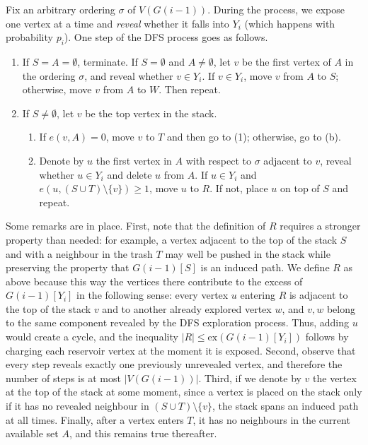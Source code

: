 \documentclass[reqno,a4paper]{amsart}
\theoremstyle{definition}
\newcommand{\ex}{\mathrm{ex}}
\begin{document}
Fix an arbitrary ordering $\sigma$ of $V(G(i-1))$. During the process, we expose one vertex at a time and \textit{reveal} whether it falls into $Y_i$ (which happens with probability $p_i$). One step of the DFS process goes as follows.
\begin{enumerate}
    \item If $S=A=\emptyset$, terminate. If $S=\emptyset$ and $A\ne\emptyset$, let $v$ be the first vertex of $A$ in the ordering $\sigma$, and reveal whether $v\in Y_i$. If $v\in Y_i$, move $v$ from $A$ to $S$; otherwise, move $v$ from $A$ to $W$. Then repeat.
    \item If $S\ne\emptyset$, let $v$ be the top vertex in the stack.
    \begin{enumerate}
        \item If $e(v,A)=0$, move $v$ to $T$ and then go to (1); otherwise, go to (b).
        \item Denote by $u$ the first vertex in $A$ with respect to $\sigma$ adjacent to $v$, reveal whether $u\in Y_i$ and delete $u$ from $A$.
        If $u\in Y_i$ and $e(u,(S\cup T)\setminus\{v\})\ge1$, move $u$ to $R$. If not, place $u$ on top of $S$ and repeat.
    \end{enumerate}
\end{enumerate}
Some remarks are in place. First, note that the definition of $R$ requires a stronger property than needed: for example, a vertex adjacent to the top of the stack $S$ and with a neighbour in the trash $T$ may well be pushed in the stack while preserving the property that $G(i-1)[S]$ is an induced path. 
We define $R$ as above because this way the vertices there contribute to the excess of $G(i-1)[Y_i]$ in the following sense: every vertex $u$ entering $R$ is adjacent to the top of the stack $v$ and to another already explored vertex $w$, and $v,w$ belong to the same component revealed by the DFS exploration process.
Thus, adding $u$ would create a cycle, and the inequality $|R|\le\ex(G(i-1)[Y_i])$ follows by charging each reservoir vertex at the moment it is exposed.
Second, observe that every step reveals exactly one previously unrevealed vertex, and therefore the number of steps is at most $|V(G(i-1))|$. 
Third, if we denote by $v$ the vertex at the top of the stack at some moment, since a vertex is placed on the stack only if it has no revealed neighbour in $(S\cup T)\setminus\{v\}$, the stack spans an induced path at all times. 
Finally, after a vertex enters $T$, it has no neighbours in the current available set $A$, and this remains true thereafter.
\end{document}
